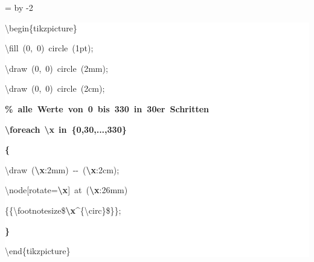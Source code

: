 \begingroup
\ttfamily
{}
=\textwidth
\advance{} by -2\fboxsep
\noindent
\colorbox{background}
{%
\parbox{\dimen255}
{%
\rule[-0.5ex]{0pt}{2.5ex}\hspace*{0.0em}\textbackslash{}begin\{tikzpicture\}\\
\rule[-0.5ex]{0pt}{2.5ex}\hspace*{1.0em}\textbackslash{}fill~(0,~0)~circle~(1pt);\\
\rule[-0.5ex]{0pt}{2.5ex}\hspace*{1.0em}\textbackslash{}draw~(0,~0)~circle~(2mm);\\
\rule[-0.5ex]{0pt}{2.5ex}\hspace*{1.0em}\textbackslash{}draw~(0,~0)~circle~(2cm);\\
\rule[-0.5ex]{0pt}{2.5ex}\hspace*{1.0em}\textcolor{G}{\textbf{\%~alle~Werte~von~0~bis~330~in~30er~Schritten}}\\
\rule[-0.5ex]{0pt}{2.5ex}\hspace*{1.0em}\textcolor{R}{\textbf{\textbackslash{}foreach}}~\textcolor{B}{\textbf{\textbackslash{}x}}~\textcolor{R}{\textbf{in~\{0,30,...,330\}}}\\
\rule[-0.5ex]{0pt}{2.5ex}\hspace*{1.0em}\textcolor{R}{\textbf{\{}}\\
\rule[-0.5ex]{0pt}{2.5ex}\hspace*{2.0em}\textbackslash{}draw~(\textcolor{B}{\textbf{\textbackslash{}x}}:2mm)~{-}{-}~(\textcolor{B}{\textbf{\textbackslash{}x}}:2cm);\\
\rule[-0.5ex]{0pt}{2.5ex}\hspace*{2.0em}\textbackslash{}node[rotate=\textcolor{B}{\textbf{\textbackslash{}x}}]~at~(\textcolor{B}{\textbf{\textbackslash{}x}}:26mm)\\
\rule[-0.5ex]{0pt}{2.5ex}\hspace*{4.5em}\{\{\textbackslash{}footnotesize\$\textcolor{B}{\textbf{\textbackslash{}x}}\^{}\{\textbackslash{}circ\}\$\}\};\\
\rule[-0.5ex]{0pt}{2.5ex}\hspace*{1.0em}\textcolor{R}{\textbf{\}}}\\
\rule[-0.5ex]{0pt}{2.5ex}\hspace*{0.0em}\textbackslash{}end\{tikzpicture\}}%
}%
\endgroup
